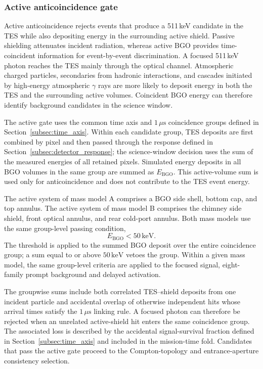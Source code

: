\documentclass[11pt]{article}
\newcommand{\revblue}[1]{\textcolor{revisionblue}{#1}}
\newcommand{\keV}{\ensuremath{\,\mathrm{keV}}}
\begin{document}
\subsubsection{Active anticoincidence gate}

Active anticoincidence rejects events that produce a 511\,keV candidate in the
TES while also depositing energy in the surrounding active shield. Passive
shielding attenuates incident radiation, whereas active BGO provides
time-coincident information for event-by-event discrimination. A focused
511\,keV photon reaches the TES mainly through the optical channel. Atmospheric
charged particles, secondaries from hadronic interactions, and
\revblue{cascades initiated by high-energy atmospheric $\gamma$ rays} are more likely to deposit energy in both the TES
and the surrounding active volumes. Coincident BGO energy can therefore
identify background candidates in the science window.

The active gate uses the common time axis and $1\,\mu\mathrm{s}$ coincidence
groups defined in Section~\ref{subsec:time_axis}. Within each candidate group,
TES deposits are first combined by pixel and then passed through the response
defined in Section~\ref{subsec:detector_response}; the science-window decision
uses the sum of the measured energies of all retained pixels. Simulated energy
deposits in all BGO volumes in the same group are summed as
$E_{\mathrm{BGO}}$. This active-volume sum is used only for anticoincidence and
does not contribute to the TES event energy.

The active system of mass model A comprises a BGO side shell, bottom cap, and
top annulus. The active system of mass model B comprises the chimney side
shield, front optical annulus, and rear cold-port annulus. Both mass models use
the same group-level passing condition,
\[
 E_{\mathrm{BGO}}<50\keV .
\]
The threshold is applied to the summed BGO deposit over the entire coincidence
group; a sum equal to or above $50\keV$ vetoes the group.
Within a given mass model, the same group-level criteria are applied to the
focused signal, \revblue{eight-family prompt background and delayed
activation}.

The groupwise sums include both correlated TES--shield deposits from one
incident particle and accidental overlap of otherwise independent hits whose
arrival times satisfy the $1\,\mu\mathrm{s}$ linking rule. A focused photon can
therefore be rejected when an unrelated active-shield hit enters the same
coincidence group. The associated loss is described by the accidental
signal-survival fraction defined in Section~\ref{subsec:time_axis} and included
in the mission-time fold. Candidates that pass the active gate proceed to the
Compton-topology and entrance-aperture consistency selection.
\end{document}
